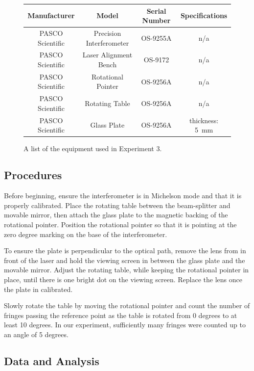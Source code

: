 \documentclass[12pt]{article}
\begin{document}
\begin{figure}[H]
  \label{tab:equip3List}
  \caption{A list of the equipment used in Experiment 3.}
  \begin{center}
    \begin{tabular}{|c|c|c|c|}
      \hline
      Manufacturer & Model & Serial Number & Specifications \\
      \hline
      PASCO Scientific & Precision Interferometer & OS-9255A & n/a \\
      PASCO Scientific & Laser Alignment Bench    & OS-9172  & n/a \\
      PASCO Scientific & Rotational Pointer       & OS-9256A & n/a \\
      PASCO Scientific & Rotating Table           & OS-9256A & n/a \\
      PASCO Scientific & Glass Plate              & OS-9256A & thickness: \SI{5}{\milli\meter} \\
      \hline
    \end{tabular}
  \end{center}
\end{figure}

\subsection{Procedures}

\qq Before beginning, ensure the interferometer is in Michelson mode and that it
is properly calibrated. Place the rotating table between the beam-splitter and
movable mirror, then attach the glass plate to the magnetic backing of the
rotational pointer. Position the rotational pointer so that it is pointing at
the zero degree marking on the base of the interferometer. 

\qq To ensure the plate is perpendicular to the optical path, remove the lens
from in front of the laser and hold the viewing screen in between the glass
plate and the movable mirror. Adjust the rotating table, while keeping the
rotational pointer in place, until there is one bright dot on the viewing
screen. Replace the lens once the plate in calibrated. 

\qq Slowly rotate the table by moving the rotational pointer and count the
number of fringes passing the reference point as the table is rotated from 0
degrees to at least 10 degrees. In our experiment, sufficiently many fringes
were counted up to an angle of 5 degrees.

\subsection{Data and Analysis}
\end{document}
